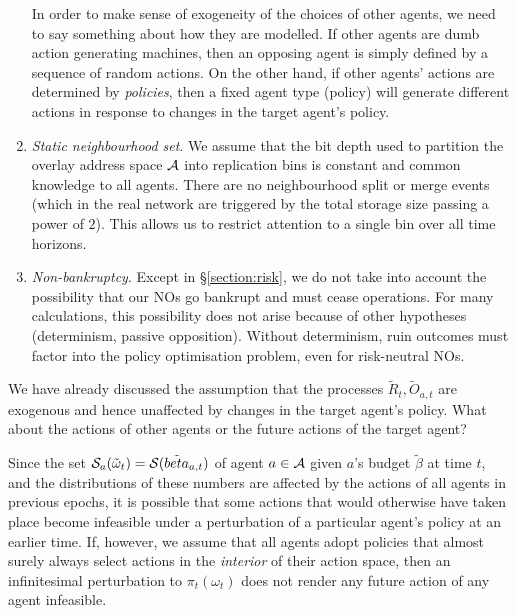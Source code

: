 \begin{enumerate}
    In order to make sense of exogeneity of the choices of other agents, we need to say something about how they are modelled.
    If other agents are dumb action generating machines, then an opposing agent is simply defined by a sequence of random actions.
    On the other hand, if other agents' actions are determined by \emph{policies}, then a fixed agent type (policy) will generate different actions in response to changes in the target agent's policy.

  \item \emph{Static neighbourhood set}.
    We assume that the bit depth used to partition the overlay address space $\mathcal{A}$ into replication bins is constant and common knowledge to all agents.
    There are no neighbourhood split or merge events (which in the real network are triggered by the total storage size passing a power of $2$).
    This allows us to restrict attention to a single bin over all time horizons.

  \item \emph{Non-bankruptcy}.
    Except in \S\ref{section:risk}, we do not take into account the possibility that our NOs go bankrupt and must cease operations.
    For many calculations, this possibility does not arise because of other hypotheses (determinism, passive opposition).
    Without determinism, ruin outcomes must factor into the policy optimisation problem, even for risk-neutral NOs.


\end{enumerate}


\begin{remark}

  We have already discussed the assumption that the processes $\tilde R_t,\tilde O_{a,t}$ are exogenous and hence unaffected by changes in the target agent's policy.
  What about the actions of other agents or the future actions of the target agent?
  
  Since the set $\mathcal{S}_a(\tilde\omega_t)=\mathcal{S}(\tilde{beta}_{a,t})$ of agent $a\in\mathcal{A}$ given $a$'s budget $\tilde{\beta}$ at time $t$, and the distributions of these numbers are affected by the actions of all agents in previous epochs, it is possible that some actions that would otherwise have taken place become infeasible under a perturbation of a particular agent's policy at an earlier time.
  If, however, we assume that all agents adopt policies that almost surely always select actions in the \emph{interior} of their action space, then an infinitesimal perturbation to $\pi_t(\omega_t)$ does not render any future action of any agent infeasible.

\end{remark}

